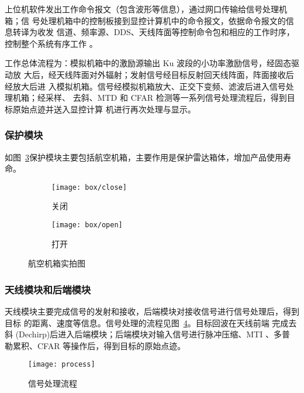 \documentclass[../main]{subfiles}
\begin{document}
上位机软件发出工作命令报文（包含波形等信息），通过网口传输给信号处理机箱；信
号处理机箱中的控制板接到显控计算机中的命令报文，依据命令报文的信息转译为收发
信道、频率源、DDS、天线阵面等控制命令包和相应的工作时序，控制整个系统有序工作
。

工作总体流程为：模拟机箱中的激励源输出 Ku 波段的小功率激励信号，经固态驱动放
大后，经天线阵面对外辐射；发射信号经目标反射回天线阵面，阵面接收后经放大后进
入模拟机箱。信号经模拟机箱放大、正交下变频、滤波后进入信号处理机箱；经采样、
去斜、MTD 和 CFAR 检测等一系列信号处理流程后，得到目标原始点迹并送入显控计算
机进行再次处理与显示。

\subsubsection{保护模块}%
\label{ssub:composition}

如图~\ref{fig:box}保护模块主要包括航空机箱，主要作用是保护雷达箱体，增加产品使用寿命。

\begin{figure}[htbp]
  \centering
  \begin{subfigure}[htbp]{0.45\linewidth}
    \centering
    \texttt{[image: box/close]}
    \caption{关闭}%
    \label{fig:box/close}
  \end{subfigure}
  \quad
  \begin{subfigure}[htbp]{0.45\linewidth}
    \centering
    \texttt{[image: box/open]}
    \caption{打开}%
    \label{fig:box/open}
  \end{subfigure}
  \caption{航空机箱实拍图}%
  \label{fig:box}
\end{figure}

\subsubsection{天线模块和后端模块}%
\label{ssub:antenna}

天线模块主要完成信号的发射和接收，后端模块对接收信号进行信号处理后，得到目标
的距离、速度等信息。信号处理的流程见图~\ref{fig:process}。目标回波在天线前端
完成去斜 (Dechirp)后进入后端模块；后端模块对输入信号进行脉冲压缩、MTI 、多普
勒累积、CFAR 等操作后，得到目标的原始点迹。

\begin{figure}[htbp]
  \centering
  \texttt{[image: process]}
  \caption{信号处理流程}%
  \label{fig:process}
\end{figure}
\end{document}
